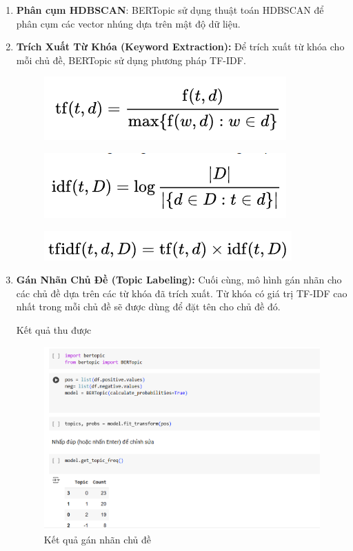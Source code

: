 \begin{enumerate}
    \item \textbf{Phân cụm HDBSCAN}: BERTopic sử dụng thuật toán HDBSCAN để phân cụm các vector nhúng dựa trên mật độ dữ liệu.

    \item \textbf{Trích Xuất Từ Khóa (Keyword Extraction):} Để trích xuất từ khóa cho mỗi chủ đề, BERTopic sử dụng phương pháp TF-IDF.

    \begin{figure}[H]
        \centering
        \includegraphics[width=0.4\linewidth]{Figures/tf.png}
        \label{fig:enter-label}
    \end{figure}

    \begin{figure}[H]
        \centering
        \includegraphics[width=0.4\linewidth]{Figures/idf.png}
        \label{fig:enter-label}
    \end{figure}

    \begin{figure}[H]
        \centering
        \includegraphics[width=0.4\linewidth]{Figures/tfidf.png}
        \label{fig:enter-label}
    \end{figure}

    \item \textbf{Gán Nhãn Chủ Đề (Topic Labeling):} Cuối cùng, mô hình gán nhãn cho các chủ đề dựa trên các từ khóa đã trích xuất. Từ khóa có giá trị TF-IDF cao nhất trong mỗi chủ đề sẽ được dùng để đặt tên cho chủ đề đó.

    Kết quả thu được

    \begin{figure}[H]
        \centering
        \includegraphics[width=1\linewidth]{Figures/8.14.png}
        \caption{Kết quả gán nhãn chủ đề}
        \label{fig:enter-label}
    \end{figure}


\end{enumerate}

